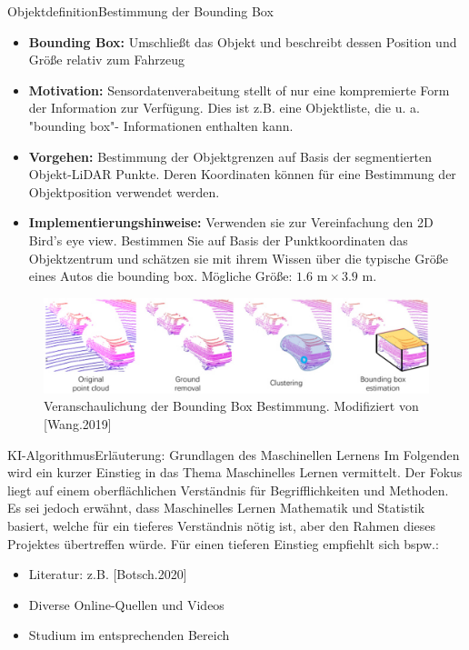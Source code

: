 \documentclass[169, handout	]{THIbeamer} %
\begin{document}
	\begin{frame}{Objektdefinition}{Bestimmung der Bounding Box}
		\footnotesize
		\begin{itemize}
			\item \textbf{Bounding Box:} Umschließt das Objekt und beschreibt dessen Position und Größe relativ zum Fahrzeug
			\item \textbf{Motivation:} Sensordatenverabeitung stellt of nur eine kompremierte Form der Information zur Verfügung. Dies ist z.B. eine Objektliste, die u. a. "bounding box"- Informationen enthalten kann. 
			\item \textbf{Vorgehen:} Bestimmung der Objektgrenzen auf Basis der segmentierten Objekt-LiDAR Punkte. Deren Koordinaten können für eine Bestimmung der Objektposition verwendet werden.
			\item \textbf{Implementierungshinweise:} Verwenden sie zur Vereinfachung den 2D Bird's eye view. Bestimmen Sie auf Basis der Punktkoordinaten das Objektzentrum und schätzen sie mit ihrem Wissen über die typische Größe eines Autos die bounding box. Mögliche Größe: $1.6 \text{ m} \times 3.9 \text{ m}$.
		\end{itemize}
		\begin{figure}
			\includegraphics[scale=0.35]{required/Bounding_Box.jpg}
			\caption{Veranschaulichung der Bounding Box Bestimmung. Modifiziert von [Wang.2019]}
        	\label{Ground Subtraction}
       	\end{figure}
	\end{frame}
	\begin{frame}{KI-Algorithmus}{Erläuterung: Grundlagen des Maschinellen Lernens}
		Im Folgenden wird ein kurzer Einstieg in das Thema Maschinelles Lernen vermittelt. Der Fokus liegt auf einem oberflächlichen Verständnis für Begrifflichkeiten und Methoden. Es sei jedoch erwähnt, dass Maschinelles Lernen Mathematik und Statistik basiert, welche für ein tieferes Verständnis nötig ist, aber den Rahmen dieses Projektes übertreffen würde.
		Für einen tieferen Einstieg empfiehlt sich bspw.: 
		\begin{itemize}
			\item  Literatur: z.B. [Botsch.2020]
			\item Diverse Online-Quellen und Videos
			\item Studium im entsprechenden Bereich 
		\end{itemize}
	\end{frame}
\end{document}
